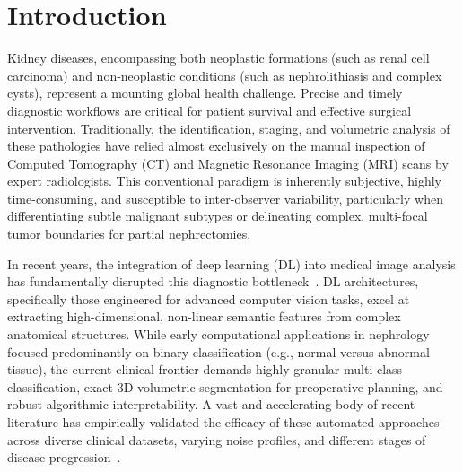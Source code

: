 \documentclass[pdflatex,sn-mathphys-num]{sn-jnl}%
\begin{document}

\maketitle

\section{Introduction}
\label{sec:intro}

Kidney diseases, encompassing both neoplastic formations (such as renal cell carcinoma) and non-neoplastic conditions (such as nephrolithiasis and complex cysts), represent a mounting global health challenge. Precise and timely diagnostic workflows are critical for patient survival and effective surgical intervention. Traditionally, the identification, staging, and volumetric analysis of these pathologies have relied almost exclusively on the manual inspection of Computed Tomography (CT) and Magnetic Resonance Imaging (MRI) scans by expert radiologists. This conventional paradigm is inherently subjective, highly time-consuming, and susceptible to inter-observer variability, particularly when differentiating subtle malignant subtypes or delineating complex, multi-focal tumor boundaries for partial nephrectomies.

In recent years, the integration of deep learning (DL) into medical image analysis has fundamentally disrupted this diagnostic bottleneck~\cite{degadwala2024review}. DL architectures, specifically those engineered for advanced computer vision tasks, excel at extracting high-dimensional, non-linear semantic features from complex anatomical structures. While early computational applications in nephrology focused predominantly on binary classification (e.g., normal versus abnormal tissue), the current clinical frontier demands highly granular multi-class classification, exact 3D volumetric segmentation for preoperative planning, and robust algorithmic interpretability. A vast and accelerating body of recent literature has empirically validated the efficacy of these automated approaches across diverse clinical datasets, varying noise profiles, and different stages of disease progression~\cite{aljohani2025hierarchical, obaid2025noisy, khan2025multilevel, verma2025automated, rehman2024kidney, scales2012prevalence, wang2022survival, rajendran2025kidney}.
\end{document}
